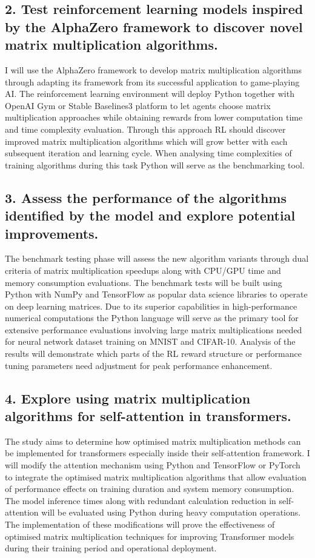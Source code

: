 \documentclass{article}
\begin{document}
\subsection*{2. Test reinforcement learning models inspired by the AlphaZero framework to discover novel matrix multiplication algorithms.}
I will use the AlphaZero framework to develop matrix multiplication algorithms through adapting its framework from its successful application to game-playing AI. The reinforcement learning environment will deploy Python together with OpenAI Gym or Stable Baselines3 platform to let agents choose matrix multiplication approaches while obtaining rewards from lower computation time and time complexity evaluation. Through this approach RL should discover improved matrix multiplication algorithms which will grow better with each subsequent iteration and learning cycle. When analysing time complexities of training algorithms during this task Python will serve as the benchmarking tool.

\subsection*{3. Assess the performance of the algorithms identified by the model and explore potential improvements.}
The benchmark testing phase will assess the new algorithm variants through dual criteria of matrix multiplication speedups along with CPU/GPU time and memory consumption evaluations. The benchmark tests will be built using Python with NumPy and TensorFlow as popular data science libraries to operate on deep learning matrices. Due to its superior capabilities in high-performance numerical computations the Python language will serve as the primary tool for extensive performance evaluations involving large matrix multiplications needed for neural network dataset training on MNIST and CIFAR-10. Analysis of the results will demonstrate which parts of the RL reward structure or performance tuning parameters need adjustment for peak performance enhancement.

\subsection*{4. Explore using matrix multiplication algorithms for self-attention in transformers.}
The study aims to determine how optimised matrix multiplication methods can be implemented for transformers especially inside their self-attention framework. I will modify the attention mechanism using Python and TensorFlow or PyTorch to integrate the optimised matrix multiplication algorithms that allow evaluation of performance effects on training duration and system memory consumption. The model inference times along with redundant calculation reduction in self-attention will be evaluated using Python during heavy computation operations. The implementation of these modifications will prove the effectiveness of optimised matrix multiplication techniques for improving Transformer models during their training period and operational deployment.
\end{document}
